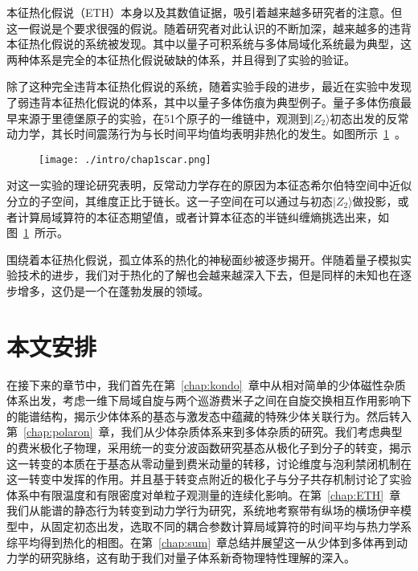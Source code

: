 本征热化假说（ETH）本身以及其数值证据，吸引着越来越多研究者的注意。但这一假说是个要求很强的假说。随着研究者对此认识的不断加深，越来越多的违背本征热化假说的系统被发现。其中以量子可积系统\cite{kinoshita2006quantum,Rigol2007Relaxation,Calabrese2011Quantum,essler2016quench,vidmar2016generalized}与多体局域化系统\cite{basko2006metal,Serbyn2013local,Huse2014Phenomenology}最为典型，这两种体系是完全的本征热化假说破缺的体系，并且得到了实验的验证。


除了这种完全违背本征热化假说的系统，随着实验手段的进步，最近在实验中发现了弱违背本征热化假说的体系，其中以量子多体伤痕为典型例子。量子多体伤痕最早来源于里德堡原子的实验，在51个原子的一维链中，观测到$|Z_2\rangle$初态出发的反常动力学，其长时间震荡行为与长时间平均值均表明非热化的发生\cite{bernien2017probing}。如图所示~\ref{scar}~。
\begin{figure}[!htbp]
    \centering
    \texttt{[image: ./intro/chap1scar.png]}
    \label{scar}
\end{figure}
对这一实验的理论研究表明，反常动力学存在的原因为本征态希尔伯特空间中近似分立的子空间，其维度正比于链长。这一子空间在可以通过与初态$|Z_2\rangle$做投影，或者计算局域算符的本征态期望值，或者计算本征态的半链纠缠熵挑选出来\cite{turner2018weak,Turner2018quantum,Ho2019periodic,Choi2019emergent,Michailidis2020slow,serbyn2021quantum}，如图~\ref{scar}~所示。

围绕着本征热化假说，孤立体系的热化的神秘面纱被逐步揭开。伴随着量子模拟实验技术的进步，我们对于热化的了解也会越来越深入下去，但是同样的未知也在逐步增多，这仍是一个在蓬勃发展的领域。





\section{本文安排}\label{1sec:sum}
在接下来的章节中，我们首先在第~\ref{chap:kondo}~章中从相对简单的少体磁性杂质体系出发，考虑一维下局域自旋与两个巡游费米子之间在自旋交换相互作用影响下的能谱结构，揭示少体体系的基态与激发态中蕴藏的特殊少体关联行为。然后转入第~\ref{chap:polaron}~章，我们从少体杂质体系来到多体杂质的研究。我们考虑典型的费米极化子物理，采用统一的变分波函数研究基态从极化子到分子的转变，揭示这一转变的本质在于基态从零动量到费米动量的转移，讨论维度与泡利禁闭机制在这一转变中发挥的作用。并且基于转变点附近的极化子与分子共存机制讨论了实验体系中有限温度和有限密度对单粒子观测量的连续化影响。在第~\ref{chap:ETH}~章我们从能谱的静态行为转变到动力学行为研究，系统地考察带有纵场的横场伊辛模型中，从固定初态出发，选取不同的耦合参数计算局域算符的时间平均与热力学系综平均得到热化的相图。在第~\ref{chap:sum}~章总结并展望这一从少体到多体再到动力学的研究脉络，这有助于我们对量子体系新奇物理特性理解的深入。


